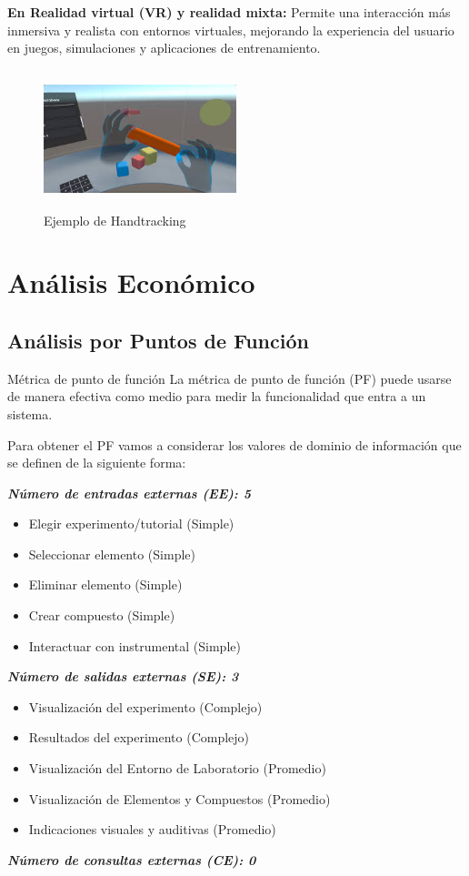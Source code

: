 \textbf{En Realidad virtual (VR) y realidad mixta:} Permite una interacción más inmersiva y realista con entornos virtuales, mejorando la experiencia del usuario en juegos, simulaciones y aplicaciones de entrenamiento.\\
\begin{figure}[thbp]
    \centering
    \includegraphics[width=0.5\textwidth, height = 4cm]{img/chapter03/hand_tracking.jpeg}
    \caption{Ejemplo de Handtracking}
    \label{fig:Handtracking}
\end{figure}
\section{Análisis Económico}
\subsection{Análisis por Puntos de Función}
Métrica de punto de función La métrica de punto de función (PF) puede usarse de manera efectiva como medio para medir la funcionalidad que entra a un sistema. 

Para obtener el PF vamos a considerar los valores de dominio de información que se definen de la siguiente forma:  

\textit{\textbf{Número de entradas externas (EE): 5}}
\begin{itemize}
    \item Elegir experimento/tutorial (Simple)
    \item Seleccionar elemento (Simple)
    \item Eliminar elemento (Simple) 
    \item Crear compuesto (Simple) 
    \item Interactuar con instrumental (Simple)
\end{itemize}
\textit{\textbf{Número de salidas externas (SE): 3  }}
\begin{itemize}
    \item Visualización del experimento (Complejo)
    \item Resultados del experimento (Complejo)
    \item Visualización del Entorno de Laboratorio (Promedio)
    \item Visualización de Elementos y Compuestos (Promedio)
    \item Indicaciones visuales y auditivas (Promedio) 
\end{itemize}
\textit{\textbf{Número de consultas externas (CE): 0  }}

